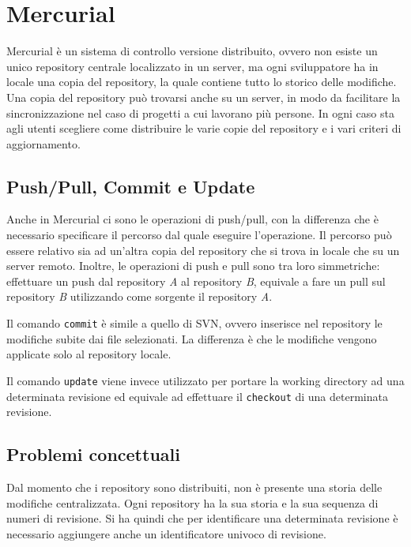 \chapter{Mercurial}


Mercurial è un sistema di controllo versione distribuito, ovvero non esiste un unico repository centrale localizzato in un server, ma ogni sviluppatore ha in locale una copia del repository, la quale contiene tutto lo storico delle modifiche.
Una copia del repository può trovarsi anche su un server, in modo da facilitare la sincronizzazione nel caso di progetti a cui lavorano più persone.
In ogni caso sta agli utenti scegliere come distribuire le varie copie del repository e i vari criteri di aggiornamento.

\section{Push/Pull, Commit e Update}

Anche in Mercurial ci sono le operazioni di push/pull, con la differenza che è necessario specificare il percorso dal quale eseguire l'operazione. 
Il percorso può essere relativo sia ad un'altra copia del repository che si trova in locale che su un server remoto.
Inoltre, le operazioni di push e pull sono tra loro simmetriche: effettuare un push dal repository \textit{A} al repository \textit{B}, equivale a fare un pull sul repository \textit{B} utilizzando come sorgente il repository \textit{A}.

Il comando \texttt{commit} è simile a quello di SVN, ovvero inserisce nel repository le modifiche subite dai file selezionati. La differenza è che le modifiche vengono applicate solo al repository locale.

Il comando \texttt{update} viene invece utilizzato per portare la working directory ad una determinata revisione ed equivale ad effettuare il \texttt{checkout} di una determinata revisione.

\section{Problemi concettuali}

Dal momento che i repository sono distribuiti, non è presente una storia delle modifiche centralizzata. Ogni repository ha la sua storia e la sua sequenza di numeri di revisione.
Si ha quindi che per identificare una determinata revisione è necessario aggiungere anche un identificatore univoco di revisione. 

